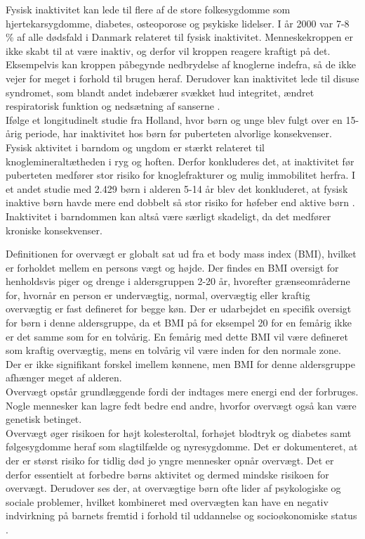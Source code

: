 Fysisk inaktivitet kan lede til flere af de store folkesygdomme som hjertekarsygdomme, diabetes, osteoporose og psykiske lidelser. I år 2000 var 7-8 \% af alle dødsfald i Danmark relateret til fysisk inaktivitet. Menneskekroppen er ikke skabt til at være inaktiv, og derfor vil kroppen reagere kraftigt på det. Eksempelvis kan kroppen påbegynde nedbrydelse af knoglerne indefra, så de ikke vejer for meget i forhold til brugen heraf.%
\citep{Kiens2007,Reshma2002,Martini2012} Derudover kan inaktivitet lede til disuse syndromet, som blandt andet indebærer svækket hud integritet, ændret respiratorisk funktion og nedsætning af sanserne \citep{Knight2012,Mosby2009}.\\
Ifølge et longitudinelt studie fra Holland, hvor børn og unge blev fulgt over en 15-årig periode, har inaktivitet hos børn før puberteten alvorlige konsekvenser. Fysisk aktivitet i barndom og ungdom er stærkt relateret til knoglemineraltætheden i ryg og hoften. Derfor konkluderes det, at inaktivitet før puberteten medfører stor risiko for knoglefrakturer og mulig immobilitet herfra. \citep{Kemper2000} I et andet studie med 2.429 børn i alderen 5-14 år blev det konkluderet, at fysisk inaktive børn havde mere end dobbelt så stor risiko for høfeber end aktive børn \citep{Kohlhammer2006}. Inaktivitet i barndommen kan altså være særligt skadeligt, da det medfører kroniske konsekvenser.

Definitionen for overvægt er globalt sat ud fra et body mass index (BMI), hvilket er forholdet mellem en persons vægt og højde\citep{Academic2016}. Der findes en BMI oversigt for henholdsvis piger og drenge i aldersgruppen 2-20 år, hvorefter grænseområderne for, hvornår en person er undervægtig, normal, overvægtig eller kraftig overvægtig er fast defineret for begge køn. Der er udarbejdet en specifik oversigt for børn i denne aldersgruppe, da et BMI på for eksempel 20 for en femårig ikke er det samme som for en tolvårig. En femårig med dette BMI vil være defineret som kraftig overvægtig, mens en tolvårig vil være inden for den normale zone. Der er ikke signifikant forskel imellem kønnene, men BMI for denne aldersgruppe afhænger meget af alderen. \citep{DiseaseControl2015}\\
Overvægt opstår grundlæggende fordi der indtages mere energi end der forbruges. Nogle mennesker kan lagre fedt bedre end andre, hvorfor overvægt også kan være genetisk betinget. \citep{Nestle2014}\\
Overvægt øger risikoen for højt kolesteroltal, forhøjet blodtryk og diabetes samt følgesygdomme heraf som slagtilfælde og nyresygdomme. Det er dokumenteret, at der er størst risiko for tidlig død jo yngre mennesker opnår overvægt. Det er derfor essentielt at forbedre børns aktivitet og dermed mindske risikoen for overvægt. \citep{Nestle2014} Derudover ses der, at overvægtige børn ofte lider af psykologiske og sociale problemer, hvilket kombineret med overvægten kan have en negativ indvirkning på barnets fremtid i forhold til uddannelse og socioøkonomiske status \citep{Academic2016}.

